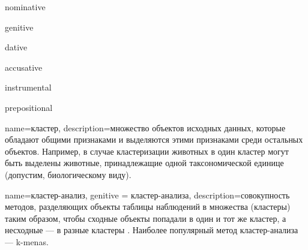 \glsaddkey
{nominative}%
{}%
{\glsentrynominative}%
{\Glsentrynominative}%
{\glsnom}%
{\Glsnom}%
{\GLSnom}%

\glsaddkey
{genitive}%
{}%
{\glsentrygenitive}%
{\Glsentrygenitive}%
{\glsgen}%
{\Glsgen}%
{\GLSgen}%


\glsaddkey
{dative}%
{}%
{\glsentrydative}%
{\Glsentrydative}%
{\glsdat}%
{\Glsdat}%
{\GLSdat}%


\glsaddkey
{accusative}%
{}%
{\glsentryaccusative}%
{\Glsentryaccusative}%
{\glsacc}%
{\Glsacc}%
{\GLSacc}%

\glsaddkey
{instrumental}%
{}%
{\glsentryinstrumental}%
{\Glsentryinstrumental}%
{\glsins}%
{\Glsins}%
{\GLSins}%

\glsaddkey
{prepositional}%
{}%
{\glsentryprepositional}%
{\Glsentryprepositional}%
{\glspre}%
{\Glspre}%
{\GLSpre}%





{
	name=кластер,
	description={множество объектов исходных данных, которые обладают общими признаками и выделяются этими признаками среди остальных объектов. Например, в случае кластеризации животных в один кластер могут быть выделены животные, принадлежащие одной таксономической единице (допустим, биологическому виду).}
}


{
	name=кластер-анализ,
	genitive = кластер-анализа,
	description={совокупность методов, разделяющих объекты таблицы наблюдений в множества (кластеры) таким образом, чтобы сходные объекты попадали в один и тот же кластер, а несходные --- в разные кластеры \cite{data-science}. Наиболее популярный метод кластер-анализа --- k-menas.}
}


